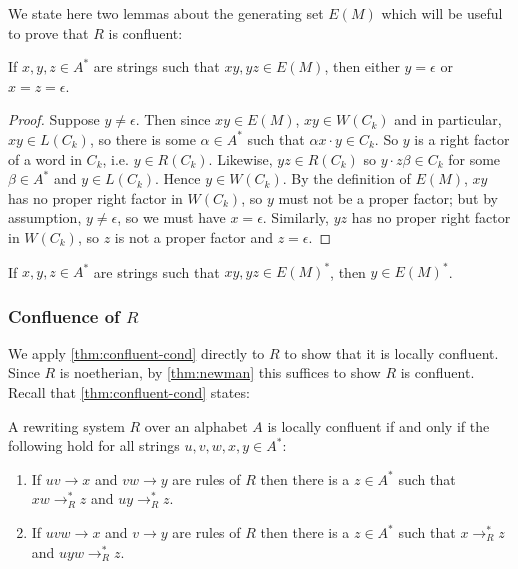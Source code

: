 \documentclass[noindex,noinsetproof,12pt]{lmaths}
\begin{document}
We state here two lemmas about the generating set $E(M)$ which will be useful to prove that $R$ is confluent:

\begin{lemma} \label{lma:no-middle-E(M)}
	If $x, y, z \in A^*$ are strings such that $xy, yz \in E(M)$, then either $y = \epsilon$ or $x = z = \epsilon$.
\end{lemma}
\begin{proof}
	Suppose $y \ne \epsilon$. Then since $xy \in E(M)$, $xy \in W(C_k)$ and in particular, $xy \in L(C_k)$, so there is some $\alpha \in A^*$ such that $\alpha x \cdot y \in C_k$. So $y$ is a right factor of a word in $C_k$, i.e. $y \in R(C_k)$. Likewise, $yz \in R(C_k)$ so $y \cdot z\beta \in C_k$ for some $\beta \in A^*$ and $y \in L(C_k)$. Hence $y \in W(C_k)$. By the definition of $E(M)$, $xy$ has no proper right factor in $W(C_k)$, so $y$ must not be a proper factor; but by assumption, $y \ne \epsilon$, so we must have $x = \epsilon$. Similarly, $yz$ has no proper right factor in $W(C_k)$, so $z$ is not a proper factor and $z = \epsilon$.
\end{proof}

\begin{cly} \label{cly:middle-E(M)*}
	If $x, y, z \in A^*$ are strings such that $xy, yz \in E(M)^*$, then $y \in E(M)^*$.
\end{cly}


\subsubsection{\texorpdfstring{Confluence of $R$}{Confluence of R}}

We apply \cref{thm:confluent-cond} directly to $R$ to show that it is locally confluent. Since $R$ is noetherian, by \cref{thm:newman} this suffices to show $R$ is confluent. Recall that \cref{thm:confluent-cond} states:

\begin{theorem*}
	A rewriting system $R$ over an alphabet $A$ is locally confluent if and only if the following hold for all strings $u, v, w, x, y \in A^*$:
	\begin{enumerate}[(1)]
		\item \label{it:conf-overlap} If $uv \to x$ and $vw \to y$ are rules of $R$ then there is a $z \in A^*$ such that $xw \to^*_R z$ and $uy \to^*_R z$.
		\item \label{it:conf-middle} If $uvw \to x$ and $v \to y$ are rules of $R$ then there is a $z \in A^*$ such that $x \to^*_R z$ and $uyw \to^*_R z$.
	\end{enumerate}
\end{theorem*}
\end{document}
